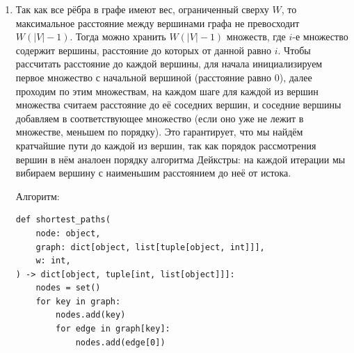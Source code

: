 \documentclass{article}
\begin{document}
\begin{enumerate}
\begin{lstlisting}
def euler_cycle(graph: dict[object, list[tuple[object, object]]]) -> list[object]:
    pairs = {}
    for node in graph:
        if node not in pairs:
            compute_pairs(node, graph, pairs)
    path = []

    def visit(node):
        print(f"we are in {node}, our path so far is {path}, we need to inspect the following pairs: {list(pairs[node].keys())}")
        while pairs[node]:
            new_node, color = next(iter(pairs[node].keys()))
            pairs[node].pop((new_node, color))
            pairs[new_node].pop((node, color))
            print(f"we are in node {node}, going to {new_node} through {color}")
            visit(new_node)
        path.append(node)
        print(f"we are in {node}, our path so far is {path}, we finished visiting our pairs")

    start_node = next(iter(graph))
    visit(start_node)
    if any(pairs[node] for node in pairs):
        raise ValueError("No euler cycle")
    return path[::-1]
    \end{lstlisting}
	      Сложность алгоритма --- $O(|E|) = O(|V| + |E|)$. Сначала
	      для каждой вершины строим список пар за линейное время,
	      сумма длин всех этих списков --- $O(|E|)$. Далее, проходим
	      алгоритмом Хиерхольцера, который работает за $O(|E|)$, так как
	      гарантированно обходит каждое ребро один раз.

	\item Так как все рёбра в графе имеют вес, ограниченный сверху $W$,
	      то максимальное расстояние между вершинами графа не превосходит
	      $W(|V| - 1)$. Тогда можно хранить $W(|V| - 1)$ множеств, где $i$-е множество
	      содержит вершины, расстояние до которых от данной равно $i$. Чтобы
	      рассчитать расстояние до каждой вершины, для начала инициализируем
	      первое множество с начальной вершиной (расстояние равно 0), далее
	      проходим по этим множествам, на каждом шаге для каждой из вершин множества
	      считаем расстояние до её соседних вершин, и соседние вершины добавляем
	      в соответствующее множество (если оно уже не лежит в множестве, меньшем
	      по порядку). Это гарантирует, что мы найдём кратчайшие пути до каждой
	      из вершин, так как порядок рассмотрения вершин в нём аналоен порядку
	      алгоритма Дейкстры: на каждой итерации мы вибираем вершину с
	      наименьшим расстоянием до неё от истока.

	      Алгоритм:
	      \begin{lstlisting}
def shortest_paths(
    node: object,
    graph: dict[object, list[tuple[object, int]]],
    w: int,
) -> dict[object, tuple[int, list[object]]]:
    nodes = set()
    for key in graph:
        nodes.add(key)
        for edge in graph[key]:
            nodes.add(edge[0])


\end{lstlisting}
\end{enumerate}
\end{document}

